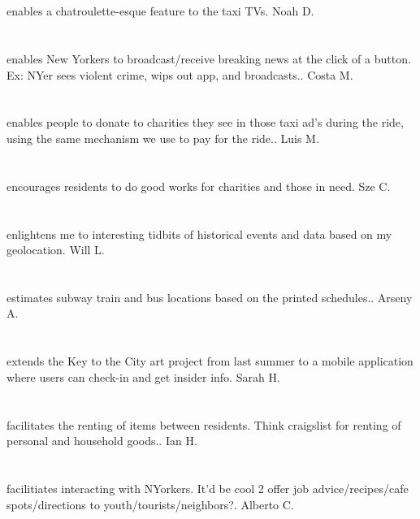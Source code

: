 \section{}enables a chatroulette-esque feature to the taxi TVs. Noah D.
\section{}enables New Yorkers to broadcast/receive  breaking news at the click of a button. Ex: NYer sees violent crime,  wips out app,  and broadcasts.. Costa M.
\section{}enables people to donate to charities they see in those taxi ad's during the ride,  using the same mechanism we use to pay for the ride.. Luis M.
\section{}encourages residents to do good works for charities and those in need. Sze C.
\section{}enlightens me to interesting tidbits of historical events and data based on my geolocation. Will L.
\section{}estimates subway train and bus locations based on the printed schedules.. Arseny A.
\section{}extends the Key to the City art project from last summer to a mobile application where users can check-in and get insider info. Sarah H.
\section{}facilitates the renting of items between residents. Think  craigslist for renting of personal and household goods.. Ian H.
\section{} facilitiates interacting with NYorkers. It'd be cool 2 offer job advice/recipes/cafe spots/directions to youth/tourists/neighbors?. Alberto C.
